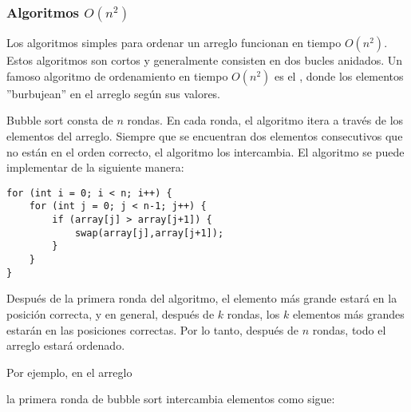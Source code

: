 \subsubsection{Algoritmos $O(n^2)$}


Los algoritmos simples para ordenar un arreglo
funcionan en tiempo $O(n^2)$.
Estos algoritmos son cortos y generalmente
consisten en dos bucles anidados.
Un famoso algoritmo de ordenamiento en tiempo $O(n^2)$
es el , donde los elementos
''burbujean'' en el arreglo según sus valores.

Bubble sort consta de $n$ rondas.
En cada ronda, el algoritmo itera a través
de los elementos del arreglo.
Siempre que se encuentran dos elementos consecutivos
que no están en el orden correcto,
el algoritmo los intercambia.
El algoritmo se puede implementar de la siguiente manera:
\begin{lstlisting}
for (int i = 0; i < n; i++) {
    for (int j = 0; j < n-1; j++) {
        if (array[j] > array[j+1]) {
            swap(array[j],array[j+1]);
        }
    }
}
\end{lstlisting}

Después de la primera ronda del algoritmo,
el elemento más grande estará en la posición correcta,
y en general, después de $k$ rondas, los $k$ elementos más grandes
estarán en las posiciones correctas.
Por lo tanto, después de $n$ rondas, todo el arreglo
estará ordenado.

Por ejemplo, en el arreglo

\begin{center}
\end{center}

\noindent
la primera ronda de bubble sort intercambia elementos
como sigue:

\begin{center}
\end{center}

